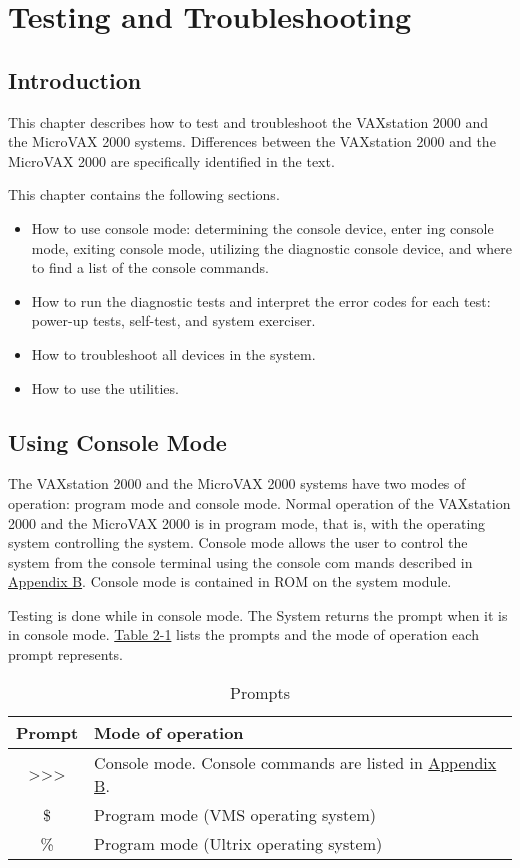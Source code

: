 \chapter{Testing and Troubleshooting}
\setcounter{page}{1}

\section{Introduction}

This chapter describes how to test and troubleshoot the VAXstation 2000
and the MicroVAX 2000 systems. Differences between the VAXstation 2000
and the MicroVAX 2000 are specifically identified in the text.

This chapter contains the following sections.

\begin{itemize}
\item How to use console mode: determining the console device, enter
ing console mode, exiting console mode, utilizing the diagnostic
console device, and where to find a list of the console commands.
\item How to run the diagnostic tests and interpret the error codes for
each test: power-up tests, self-test, and system exerciser.
\item How to troubleshoot all devices in the system.
\item How to use the utilities.
\end{itemize}

\section{Using Console Mode}

The VAXstation 2000 and the MicroVAX 2000 systems have two modes
of operation: program mode and console mode. Normal operation of the
VAXstation 2000 and the MicroVAX 2000 is in program mode, that is, with
the operating system controlling the system. Console mode allows the user
to control the system from the console terminal using the console com
mands described in \hyperlink{appendix.b}{Appendix B}. Console mode is contained in ROM on
the system module.

Testing is done while in console mode. The System returns the \console
prompt when it is in console mode. \hyperref[table:2-1]{Table 2-1} lists the prompts and the
mode of operation each prompt represents.

\begin{table}[H]
\caption{Prompts}
\label{table:2-1}
\small
\begin{tabularx}{\textwidth}{c l}
\hline
\textbf{Prompt} & \textbf{Mode of operation}\\
\hline
{>}{>}{>} & Console mode. Console commands are listed in \hyperlink{appendix.b}{Appendix B}. \\
\$ & Program mode (VMS operating system) \\
\% & Program mode (Ultrix operating system) \\
\hline
\end{tabularx}
\end{table}

